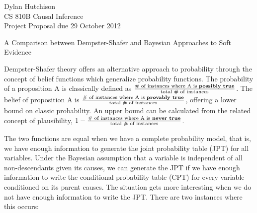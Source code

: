 \documentclass[letterpaper]{article}
\begin{document}
\thispagestyle{empty}
\pagestyle{empty} %


\noindent Dylan Hutchison\\
CS 810B Causal Inference\\
Project Proposal due 29 October 2012
\begin{center}
A Comparison between Dempster-Shafer and Bayesian Approaches to Soft Evidence
\end{center}

Dempster-Shafer theory offers an alternative approach to probability through the concept of belief functions which generalize probability functions.  The probability of a proposition A is classically defined as $\frac{\text{\# of instances where A is \textbf{possibly true}}}{\text{total \# of instances}}$. The belief of proposition A is $\frac{\text{\# of instances where A is \textbf{provably true}}}{\text{total \# of instances}}$, offering a lower bound on classic probability.  An upper bound can be calculated from the related concept of plausibility, $1-\frac{\text{\# of instances where A is \textbf{never true}}}{\text{total \# of instances}}$.

The two functions are equal when we have a complete probability model, that is, we have enough information to generate the joint probability table (JPT) for all variables. Under the Bayesian assumption that a variable is independent of all non-descendants given its causes, we can generate the JPT if we have enough information to write the conditional probability table (CPT) for every variable conditioned on its parent causes.  The situation gets more interesting when we do not have enough information to write the JPT.  There are two instances where this occurs:
\end{document}
